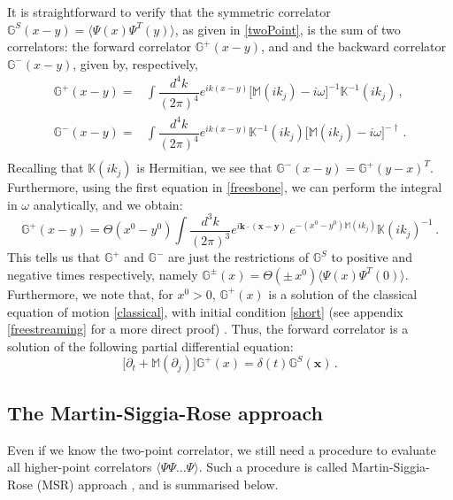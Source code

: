 \documentclass[a4paper, amsfonts, amssymb, amsmath, reprint, showkeys, nofootinbib, twoside,notitlepage,onecolumn]{revtex4-2}
\newcommand{\Ma}{{\mathbb{M}}}
\newcommand{\Ga}{{\mathbb{G}}}
\newcommand{\Ka}{{\mathbb{K}}}
\theoremstyle{definition}
\begin{document}
It is straightforward to verify that the symmetric correlator $\Ga^S(x-y)=\langle \Psi(x)\Psi^T(y)\rangle$, as given in \eqref{twoPoint}, is the sum of two correlators: the forward correlator $\Ga^+(x{-}y)$, and and the backward correlator $\Ga^-(x{-}y)$, given by, respectively,
\begin{equation}\label{cacioppoli}
\begin{split}
\Ga^+(x-y)={}& \int \dfrac{d^4 k}{(2\pi)^4} e^{i k (x-y)} \big[\Ma(ik_j)-i\omega \big]^{-1}\Ka^{-1}(ik_j) \, , \\
\Ga^-(x-y)={}& \int \dfrac{d^4 k}{(2\pi)^4} e^{i k (x-y)} \Ka^{-1}(ik_j) \big[\Ma(ik_j)-i\omega \big]^{-\dagger} \, . \\
\end{split}
\end{equation}
Recalling that $\Ka(ik_j)$ is Hermitian, we see that $\Ga^-(x-y)=\Ga^+(y-x)^T$. Furthermore, using the first equation in \eqref{freesbone}, we can perform the integral in $\omega$ analytically, and we obtain:
\begin{equation}\label{retuzinfinie}
   \Ga^+(x-y)  = \Theta(x^0{-}y^0) \int \dfrac{d^3 k}{(2\pi)^3} e^{i\textbf{k}\cdot(\textbf{x}-\textbf{y})} \, e^{-(x^0-y^0)\Ma(ik_j)}\Ka(ik_j)^{-1} \, .   
\end{equation}
This tells us that $\Ga^+$ and $\Ga^-$ are just the restrictions of $\Ga^S$ to positive and negative times respectively, namely $\Ga^\pm(x)=\Theta(\pm \, x^0)\langle \Psi(x)\Psi^T(0)\rangle$. Furthermore, we note that, for $x^0>0$, $\Ga^+(x)$ is a solution of the classical equation of motion \eqref{classical}, with initial condition \eqref{short} (see appendix \ref{freestreaming} for a more direct proof) \cite{landau5}. Thus, the forward correlator is a solution of the following partial differential equation:
\begin{equation}\label{fubini}
    \big[\partial_t +\Ma(\partial_j)\big] \Ga^+(x) = \delta(t) \Ga^S(\textbf{x}) \, .
\end{equation}


\subsection{The Martin-Siggia-Rose approach}

Even if we know the two-point correlator, we still need a procedure to evaluate all higher-point correlators $\langle \Psi \Psi...\Psi\rangle$. Such a procedure is called Martin-Siggia-Rose (MSR) approach \cite{Martin:1973zz,Granese:2022igc}, and is summarised below.
\end{document}
